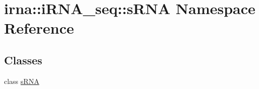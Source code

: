 \hypertarget{namespaceirna_1_1iRNA__seq_1_1sRNA}{
\section{irna\-:\-:i\-R\-N\-A\-\_\-seq\-:\-:s\-R\-N\-A \-Namespace \-Reference}
\label{namespaceirna_1_1iRNA__seq_1_1sRNA}
}
\subsection*{\-Classes}
\begin{DoxyCompactItemize}
\item 
class \hyperlink{classirna_1_1iRNA__seq_1_1sRNA_1_1sRNA}{s\-R\-N\-A}
\end{DoxyCompactItemize}
